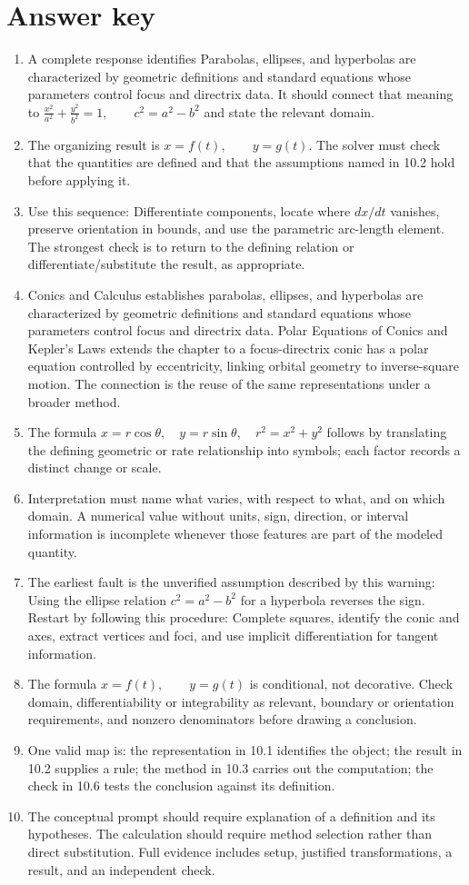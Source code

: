\documentclass[11pt]{article}
\begin{document}
\section{Answer key}
\small
\begin{enumerate}
\item A complete response identifies Parabolas, ellipses, and hyperbolas are characterized by geometric definitions and standard equations whose parameters control focus and directrix data. It should connect that meaning to \(\frac{x^2}{a^2}+\frac{y^2}{b^2}=1,\qquad c^2=a^2-b^2\) and state the relevant domain.
\item The organizing result is \(x=f(t),\qquad y=g(t)\). The solver must check that the quantities are defined and that the assumptions named in 10.2 hold before applying it.
\item Use this sequence: Differentiate components, locate where $dx/dt$ vanishes, preserve orientation in bounds, and use the parametric arc-length element. The strongest check is to return to the defining relation or differentiate/substitute the result, as appropriate.
\item Conics and Calculus establishes parabolas, ellipses, and hyperbolas are characterized by geometric definitions and standard equations whose parameters control focus and directrix data. Polar Equations of Conics and Kepler's Laws extends the chapter to a focus-directrix conic has a polar equation controlled by eccentricity, linking orbital geometry to inverse-square motion. The connection is the reuse of the same representations under a broader method.
\item The formula \(x=r\cos\theta,\quad y=r\sin\theta,\quad r^2=x^2+y^2\) follows by translating the defining geometric or rate relationship into symbols; each factor records a distinct change or scale.
\item Interpretation must name what varies, with respect to what, and on which domain. A numerical value without units, sign, direction, or interval information is incomplete whenever those features are part of the modeled quantity.
\item The earliest fault is the unverified assumption described by this warning: Using the ellipse relation $c^2=a^2-b^2$ for a hyperbola reverses the sign. Restart by following this procedure: Complete squares, identify the conic and axes, extract vertices and foci, and use implicit differentiation for tangent information.
\item The formula \(x=f(t),\qquad y=g(t)\) is conditional, not decorative. Check domain, differentiability or integrability as relevant, boundary or orientation requirements, and nonzero denominators before drawing a conclusion.
\item One valid map is: the representation in 10.1 identifies the object; the result in 10.2 supplies a rule; the method in 10.3 carries out the computation; the check in 10.6 tests the conclusion against its definition.
\item The conceptual prompt should require explanation of a definition and its hypotheses. The calculation should require method selection rather than direct substitution. Full evidence includes setup, justified transformations, a result, and an independent check.
\end{enumerate}
\end{document}
